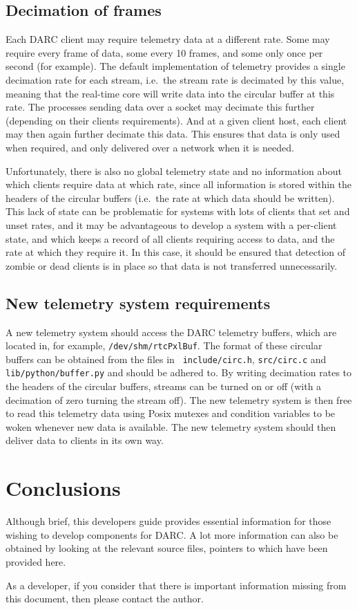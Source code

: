 \documentclass[a4,10pt]{article}
\begin{document}
\subsection{Decimation of frames}
Each DARC client may require telemetry data at a different rate.  Some
may require every frame of data, some every 10 frames, and some only
once per second (for example).  The default implementation of
telemetry provides a single decimation rate for each stream, i.e.\ the
stream rate is decimated by this value, meaning that the real-time
core will write data into the circular buffer at this rate.  The
processes sending data over a socket may decimate this further
(depending on their clients requirements).  And at a given client host,
each client may then again further decimate this data.  This ensures
that data is only used when required, and only delivered over a
network when it is needed.

Unfortunately, there is also no global telemetry state and no
information about which clients require data at which rate, since
all information is stored within the headers of the circular buffers
(i.e.\ the rate at which data should be written).  This lack of state
can be problematic for systems with lots of clients that set and unset
rates, and it may be advantageous to develop a system with a
per-client state, and which keeps a record of all clients requiring
access to data, and the rate at which they require it.  In this case,
it should be ensured that detection of zombie or dead clients is in
place so that data is not transferred unnecessarily.  

\subsection{New telemetry system requirements}
A new telemetry system should access the DARC telemetry buffers, which
are located in, for example, {\tt /dev/shm/rtcPxlBuf}.  The format of
these circular buffers can be obtained from the files in {\tt
  include/circ.h}, {\tt src/circ.c} and {\tt lib/python/buffer.py} and
should be adhered to.  By writing decimation rates to the headers of
the circular buffers, streams can be turned on or off (with a
decimation of zero turning the stream off).  The new telemetry system
is then free to read this telemetry data using Posix mutexes and
condition variables to be woken whenever new data is available.  The
new telemetry system should then deliver data to clients in its own
way.

\section{Conclusions}
Although brief, this developers guide provides essential information
for those wishing to develop components for DARC.  A lot more
information can also be obtained by looking at the relevant source
files, pointers to which have been provided here.

As a developer, if you consider that there is important information
missing from this document, then please contact the author.
\end{document}
